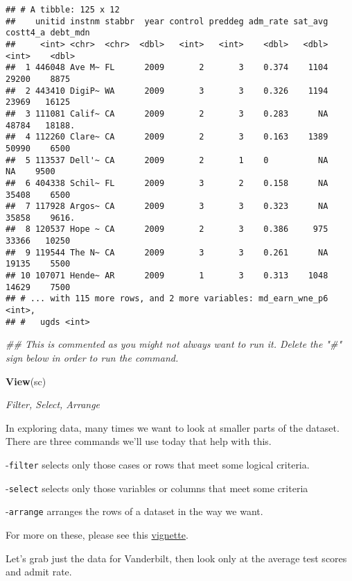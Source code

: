 \documentclass[
]{article}
\newenvironment{Shaded}{\begin{snugshade}}{\end{snugshade}}
\newcommand{\CommentTok}[1]{\textcolor[rgb]{0.56,0.35,0.01}{\textit{#1}}}
\newcommand{\KeywordTok}[1]{\textcolor[rgb]{0.13,0.29,0.53}{\textbf{#1}}}
\newcommand{\NormalTok}[1]{#1}
\begin{document}
\begin{verbatim}
## # A tibble: 125 x 12
##    unitid instnm stabbr  year control preddeg adm_rate sat_avg costt4_a debt_mdn
##     <int> <chr>  <chr>  <dbl>   <int>   <int>    <dbl>   <dbl>    <int>    <dbl>
##  1 446048 Ave M~ FL      2009       2       3    0.374    1104    29200    8875 
##  2 443410 DigiP~ WA      2009       3       3    0.326    1194    23969   16125 
##  3 111081 Calif~ CA      2009       2       3    0.283      NA    48784   18188.
##  4 112260 Clare~ CA      2009       2       3    0.163    1389    50990    6500 
##  5 113537 Dell'~ CA      2009       2       1    0          NA       NA    9500 
##  6 404338 Schil~ FL      2009       3       2    0.158      NA    35408    6500 
##  7 117928 Argos~ CA      2009       3       3    0.323      NA    35858    9616.
##  8 120537 Hope ~ CA      2009       2       3    0.386     975    33366   10250 
##  9 119544 The N~ CA      2009       3       3    0.261      NA    19135    5500 
## 10 107071 Hende~ AR      2009       1       3    0.313    1048    14629    7500 
## # ... with 115 more rows, and 2 more variables: md_earn_wne_p6 <int>,
## #   ugds <int>
\end{verbatim}

\begin{Shaded}
\begin{Highlighting}[]
\CommentTok{## This is commented as you might not always want to run it. Delete the "#" sign below in order to run the command. }

\KeywordTok{View}\NormalTok{(sc)}
\end{Highlighting}
\end{Shaded}

\emph{Filter, Select, Arrange}

In exploring data, many times we want to look at smaller parts of the
dataset. There are three commands we'll use today that help with this.

-\texttt{filter} selects only those cases or rows that meet some logical
criteria.

-\texttt{select} selects only those variables or columns that meet some
criteria

-\texttt{arrange} arranges the rows of a dataset in the way we want.

For more on these, please see this
\href{https://cran.rstudio.com/web/packages/dplyr/vignettes/introduction.html}{vignette}.

Let's grab just the data for Vanderbilt, then look only at the average
test scores and admit rate.
\end{document}
